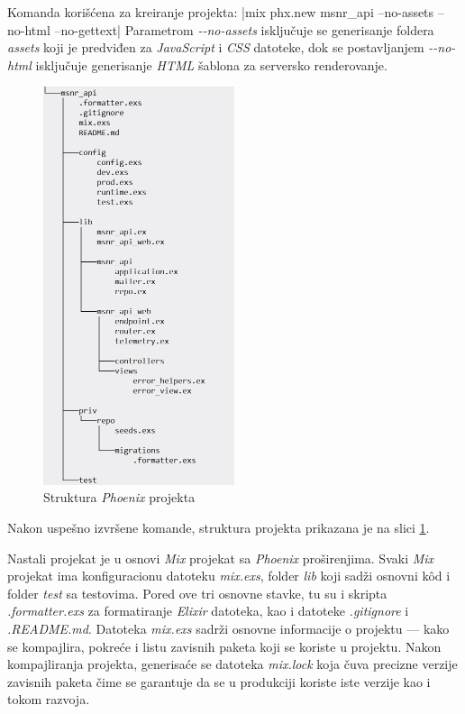 \documentclass[12pt,oneside]{memoir}
\begin{document}
Komanda korišćena za kreiranje projekta:
|mix phx.new msnr_api --no-assets --no-html --no-gettext|
\noindent Parametrom \emph{-{}-no-assets} isključuje se generisanje foldera \emph{assets} koji je predviđen za \emph{JavaScript} i \emph{CSS} datoteke,
dok se postavljanjem \emph{-{}-no-html} isključuje generisanje \emph{HTML} šablona za serversko renderovanje.
\begin{figure}[!h]
  \centering
  \includegraphics[width=0.5\textwidth]{msnr-dir.png}
  \caption{Struktura \emph{Phoenix} projekta}
  \label{fig:msnr-dir}
\end{figure}
Nakon uspešno izvršene komande, struktura projekta prikazana je na slici \ref{fig:msnr-dir}.

Nastali projekat je u osnovi \emph{Mix} projekat sa \emph{Phoenix} proširenjima. Svaki \emph{Mix} projekat ima
konfiguracionu datoteku \emph{mix.exs}, folder \emph{lib} koji sadži osnovni k\^{o}d i folder \emph{test} sa testovima.
Pored ove tri osnovne stavke, tu su i skripta \emph{.formatter.exs} za formatiranje \emph{Elixir} datoteka, kao i datoteke \emph{.gitignore} i
\emph{.README.md}. Datoteka \emph{mix.exs} sadrži osnovne informacije o projektu --- kako se kompajlira, pokreće i 
listu zavisnih paketa koji se koriste u projektu. Nakon kompajliranja projekta, generisaće se datoteka \emph{mix.lock} koja
čuva precizne verzije zavisnih paketa čime se garantuje da se u produkciji koriste iste verzije kao i tokom razvoja.
\end{document}
